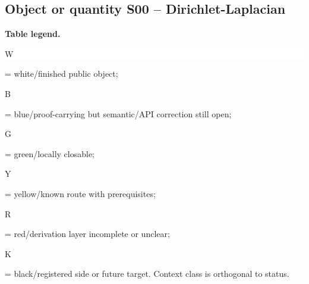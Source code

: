 \subsection*{Object or quantity S00 -- Dirichlet-Laplacian}
\hypertarget{objproof:S00}{}
\par\smallskip\noindent\begin{minipage}{0.99\linewidth}\footnotesize\raggedright\textbf{Table legend.} \colorbox{white}{\strut W} = white/finished public object; \colorbox{cyan!20}{\strut B} = blue/proof-carrying but semantic/API correction still open; \colorbox{green!18}{\strut G} = green/locally closable; \colorbox{yellow!25}{\strut Y} = yellow/known route with prerequisites; \colorbox{red!20}{\strut R} = red/derivation layer incomplete or unclear; \colorbox{black!18}{\strut K} = black/registered side or future target. Context class is orthogonal to status.\end{minipage}\par\vspace{0.25em}

